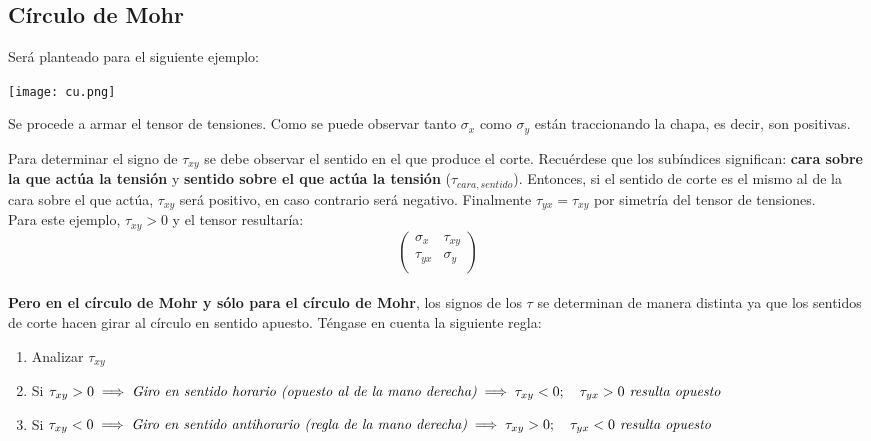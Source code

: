 \documentclass[a4paper,12pt,twoside,final,spanish]{article}
\begin{document}
\subsection*{Círculo de Mohr}

Será planteado para el siguiente ejemplo:\\

\begin{center}
\texttt{[image: cu.png]}
\end{center}

Se procede a armar el tensor de tensiones. Como se puede observar tanto $\sigma_{x}$ como $\sigma_{y}$ están traccionando la chapa, es decir, son positivas.

Para determinar el signo de $\tau_{xy}$ se debe observar el sentido en el que produce el corte. Recuérdese que los subíndices significan: \textbf{cara sobre la que actúa la tensión} y \textbf{sentido sobre el que actúa la tensión} ($\tau_{cara,sentido}$). Entonces, si el sentido de corte es el mismo al de la cara sobre el que actúa, $\tau_{xy}$ será positivo, en caso contrario será negativo. Finalmente $\tau_{yx}=\tau_{xy}$ por simetría del tensor de tensiones.\\

Para este ejemplo, $\tau_{xy}>0$ y el tensor resultaría:\\

\[
\left(\begin{matrix}
\sigma_{x} & \tau_{xy} \\
\tau_{yx} & \sigma_{y} \\
\end{matrix}\right)
\]\\

\textbf{Pero en el círculo de Mohr y sólo para el círculo de Mohr}, los signos de los $\tau$ se determinan de manera distinta ya que los sentidos de corte hacen girar al círculo en sentido apuesto. Téngase en cuenta la siguiente regla:
\begin{enumerate}[1.]
\item Analizar $\tau_{xy}$
\item Si $\tau_{xy}>0
\implies\textit{Giro en sentido horario (opuesto al de la mano derecha)}\\
\implies\tau_{xy}<0;\quad\tau_{yx}>0 \textit{ resulta opuesto}$ 
\item Si $\tau_{xy}<0
\implies\textit{Giro en sentido antihorario (regla de la mano derecha)}\\
\implies\tau_{xy}>0;\quad\tau_{yx}<0 \textit{ resulta opuesto}$
\end{enumerate}
\end{document}
